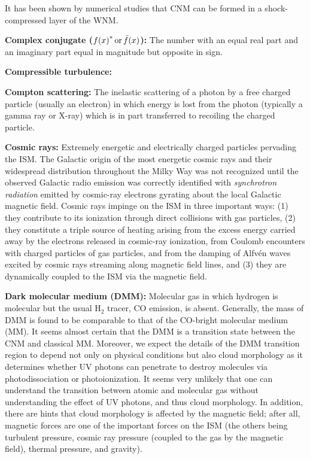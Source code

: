 \documentclass[a4paper,10pt]{article}
\begin{document}
{\noindent}It has been shown by numerical studies that CNM can be formed in a shock-compressed layer of the WNM.

{\noindent}\textbf{Complex conjugate (${f(x)}^*\,{\rm or}\,\bar{f}(x)$):} The number with an equal real part and an imaginary part equal in magnitude but opposite in sign.

{\noindent}\textbf{Compressible turbulence:}

{\noindent}\textbf{Compton scattering:} The inelastic scattering of a photon by a free charged particle (usually an electron) in which energy is lost from the photon (typically a gamma ray or X-ray) which is in part transferred to recoiling the charged particle.

{\noindent}\textbf{Cosmic rays:} Extremely energetic and electrically charged particles pervading the ISM. The Galactic origin of the most energetic cosmic rays and their widespread distribution throughout the Milky Way was not recognized until the observed Galactic radio emission was correctly identified with \textit{synchrotron radiation} emitted by cosmic-ray electrons gyrating about the local Galactic magnetic field. Cosmic rays impinge on the ISM in three important ways: (1) they contribute to its ionization through direct collisions with gas particles, (2) they constitute a triple source of heating arising from the excess energy carried away by the electrons released in cosmic-ray ionization, from Coulomb encounters with charged particles of gas particles, and from the damping of Alfv\'en waves excited by cosmic rays streaming along magnetic field lines, and (3) they are dynamically coupled to the ISM via the magnetic field.

{\noindent}\textbf{Dark molecular medium (DMM):} Molecular gas in which hydrogen is molecular but the usual H$_2$ tracer, CO emission, is absent. Generally, the mass of DMM is found to be comparable to that of the CO-bright molecular medium (MM). It seems almost certain that the DMM is a transition state between the CNM and classical MM. Moreover, we expect the details of the DMM transition region to depend not only on physical conditions but also cloud morphology as it determines whether UV photons can penetrate to destroy molecules via photodissociation or photoionization. It seems very unlikely that one can understand the transition between atomic and molecular gas without understanding the effect of UV photons, and thus cloud morphology. In addition, there are hints that cloud morphology is affected by the magnetic field; after all, magnetic forces are one of the important forces on the ISM (the others being turbulent pressure, cosmic ray pressure (coupled to the gas by the magnetic field), thermal pressure, and gravity).
\end{document}
